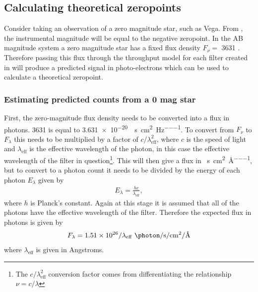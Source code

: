 \subsection{Calculating theoretical zeropoints}
\label{sec:model_zeropoints}
\begin{colsection}

Consider taking an observation of a zero magnitude star, such as Vega. From , the instrumental magnitude will be equal to the negative zeropoint. In the AB magnitude system a zero magnitude star has a fixed flux density $F_\nu = $ \SI{3631}{\jansky} \citep{Sloan_filters}. Therefore passing this flux through the throughput model for each filter created in  will produce a predicted signal in photo-electrons which can be used to calculate a theoretical zeropoint.

\subsubsection{Estimating predicted counts from a 0 mag star}

First, the zero-magnitude flux density needs to be converted into a flux in photons. \SI{3631}{\jansky} is equal to \SI{3.631e-20}{\erg\per\second\per\centi\metre\squared\per\hertz}. To convert from $F_\nu$ to $F_\lambda$ this needs to be multiplied by a factor of $c/\lambda_\text{eff}^2$, where $c$ is the speed of light and $\lambda_\text{eff}$ is the effective wavelength of the photon, in this case the effective wavelength of the filter in question\footnote{The $c/\lambda_\text{eff}^2$ conversion factor comes from differentiating the relationship $\nu = c/\lambda$}. This will then give a flux in \si{\erg\per\second\per\centi\metre\squared\per\angstrom}, but to convert to a photon count it needs to be divided by the energy of each photon $E_\lambda$ given by
%
\begin{equation}
    \begin{split}
        E_\lambda = \frac{hc}{\lambda_\text{eff}},
    \end{split}
    \label{eq:photon_energy}
\end{equation}
%
where $h$ is Planck's constant. Again at this stage it is assumed that all of the photons have the effective wavelength of the filter. Therefore the expected flux in photons is given by
%
\begin{equation}
    \begin{split}
        F_\lambda = 1.51 \times 10^{26}/\lambda_\text{eff}~\si{\photon\per\second\per\centi\metre\squared\per\angstrom}
    \end{split}
    \label{eq:zero-mag_photons}
\end{equation}
%
where $\lambda_\text{eff}$ is given in Angstroms.


\end{colsection}
